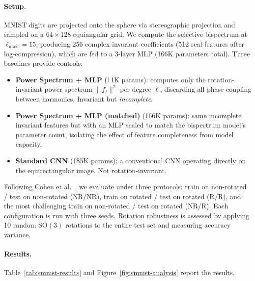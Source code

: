 \documentclass{article}
\newcommand{\SO}{\mathrm{SO}}
\begin{document}
\paragraph{Setup.}
MNIST digits are projected onto the sphere via stereographic projection and
sampled on a $64 \times 128$ equiangular grid. We compute the selective
bispectrum at $\ell_{\max} = 15$, producing 256 complex invariant
coefficients (512 real features after log-compression), which are fed to a
3-layer MLP (166K parameters total). Three baselines provide controls:
\begin{itemize}
  \item \textbf{Power Spectrum + MLP} (11K params): computes only the
    rotation-invariant power spectrum $\|f_\ell\|^2$ per degree $\ell$,
    discarding all phase coupling between harmonics. Invariant but
    \emph{incomplete}.
  \item \textbf{Power Spectrum + MLP (matched)} (166K params): same
    incomplete invariant features but with an MLP scaled to match the
    bispectrum model's parameter count, isolating the effect of
    feature completeness from model capacity.
  \item \textbf{Standard CNN} (185K params): a conventional CNN operating
    directly on the equirectangular image. Not rotation-invariant.
\end{itemize}
Following Cohen et al.~\cite{cohen2018spherical}, we evaluate under three
protocols: train on non-rotated / test on non-rotated (NR/NR), train on
rotated / test on rotated (R/R), and the most challenging train on
non-rotated / test on rotated (NR/R). Each configuration is run with three
seeds. Rotation robustness is assessed by applying 10 random $\SO(3)$
rotations to the entire test set and measuring accuracy variance.

\paragraph{Results.}
Table~\ref{tab:smnist-results} and Figure~\ref{fig:smnist-analysis} report
the results.
\end{document}
